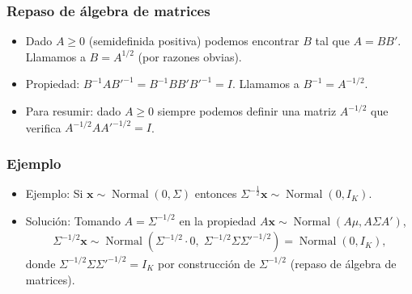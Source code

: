 \documentclass[t, compress, spanish, aspectratio=169]{beamer}
\DeclareMathOperator{\N}{Normal}
\begin{document}
  \begin{frame}
        \frametitle{Repaso de \'algebra de matrices}
        \begin{itemize}
            \item Dado $A \geq 0$ (semidefinida positiva) podemos encontrar $B$ tal que $A = B B'$. Llamamos a $B = A ^{1/2}$ (por razones obvias).
            \item Propiedad: $B^{-1}AB'^{-1} = B^{-1}BB'B'^{-1} = I$. Llamamos a $B ^{-1}= A^{-1/2}$.
            \item Para resumir: dado  $A \geq 0$ siempre podemos definir una matriz $A^{-1/2}$ que verifica $A^{-1/2}AA'^{-1/2}=I$.
        \end{itemize}
    \end{frame}

  \begin{frame}
        \frametitle{Ejemplo}
        \begin{itemize}
            \item Ejemplo: Si $\mathbf{x}\sim \N(0, \Sigma)$ entonces   $\Sigma^{-\frac{1}{2}} \mathbf{x}\sim \N(0, I_K)$.
            \item [] Soluci\'on: Tomando $A=\Sigma^{-1/2}$ en la propiedad $A\mathbf{x}\sim \N(A\mu, A\Sigma A')$,
            \begin{align*}
            \Sigma^{-1/2}\mathbf{x} \sim \N\left(\Sigma^{-1/2}\cdot 0,\; \Sigma^{-1/2}\Sigma\Sigma'^{-1/2}\right) = \N(0, I_K),
            \end{align*}
            donde $\Sigma^{-1/2}\Sigma\Sigma'^{-1/2}=I_K$ por construcci\'on de $\Sigma^{-1/2}$ (repaso de \'algebra de matrices).
        \end{itemize}
    \end{frame}
\end{document}
